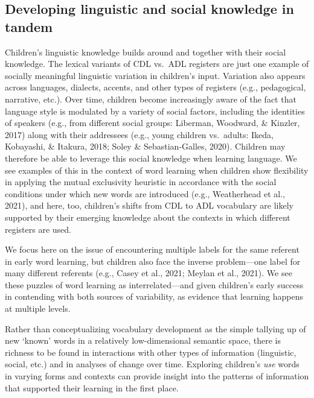 \documentclass[10pt, letterpaper]{article}
\begin{document}
\hypertarget{developing-linguistic-and-social-knowledge-in-tandem}{%
\subsection{Developing linguistic and social knowledge in
tandem}\label{developing-linguistic-and-social-knowledge-in-tandem}}

Children's linguistic knowledge builds around and together with their
social knowledge. The lexical variants of CDL vs.~ADL registers are just
one example of socially meaningful linguistic variation in children's
input. Variation also appears across languages, dialects, accents, and
other types of registers (e.g., pedagogical, narrative, etc.). Over
time, children become increasingly aware of the fact that language style
is modulated by a variety of social factors, including the identities of
speakers (e.g., from different social groups: Liberman, Woodward, \&
Kinzler, 2017) along with their addressees (e.g., young children
vs.~adults: Ikeda, Kobayashi, \& Itakura, 2018; Soley \&
Sebastian-Galles, 2020). Children may therefore be able to leverage this
social knowledge when learning language. We see examples of this in the
context of word learning when children show flexibility in applying the
mutual exclusivity heuristic in accordance with the social conditions
under which new words are introduced (e.g., Weatherhead et al., 2021),
and here, too, children's shifts from CDL to ADL vocabulary are likely
supported by their emerging knowledge about the contexts in which
different registers are used.

We focus here on the issue of encountering multiple labels for the same
referent in early word learning, but children also face the inverse
problem---one label for many different referents (e.g., Casey et al.,
2021; Meylan et al., 2021). We see these puzzles of word learning as
interrelated---and given children's early success in contending with
both sources of variability, as evidence that learning happens at
multiple levels.

Rather than conceptualizing vocabulary development as the simple
tallying up of new `known' words in a relatively low-dimensional
semantic space, there is richness to be found in interactions with other
types of information (linguistic, social, etc.) and in analyses of
change over time. Exploring children's \emph{use} words in varying forms
and contexts can provide insight into the patterns of information that
supported their learning in the first place.
\end{document}
